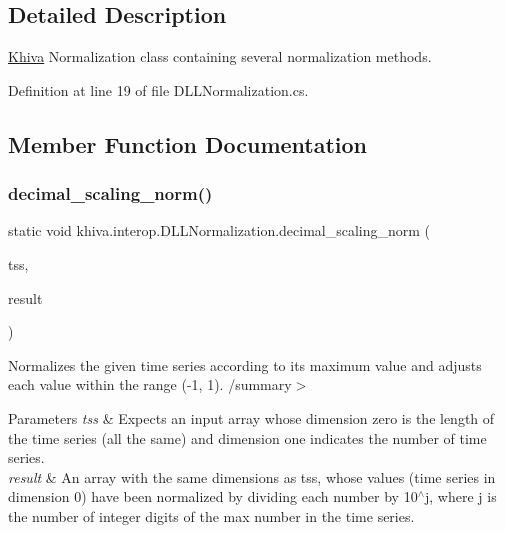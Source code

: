 \subsection{Detailed Description}
\mbox{\hyperlink{classkhiva_1_1_khiva}{Khiva}} Normalization class containing several normalization methods. 



Definition at line 19 of file D\+L\+L\+Normalization.\+cs.



\subsection{Member Function Documentation}
\mbox{\label{classkhiva_1_1interop_1_1_d_l_l_normalization_a4b8a8b57779a2e2a9681873ed38d1ead}} 
\subsubsection{\texorpdfstring{decimal\+\_\+scaling\+\_\+norm()}{decimal\_scaling\_norm()}}
{\footnotesize\ttfamily static void khiva.\+interop.\+D\+L\+L\+Normalization.\+decimal\+\_\+scaling\+\_\+norm (\begin{DoxyParamCaption}\item[{\mbox{[}\+In\mbox{]} ref Int\+Ptr}]{tss,  }\item[{\mbox{[}\+Out\mbox{]} out Int\+Ptr}]{result }\end{DoxyParamCaption})\hspace{0.3cm}{\ttfamily [static]}}



Normalizes the given time series according to its maximum value and adjusts each value within the range (-\/1, 1). /summary$>$ 
\begin{DoxyParams}{Parameters}
{\em tss} & Expects an input array whose dimension zero is the length of the time series (all the same) and dimension one indicates the number of time series.\\
\hline
{\em result} & An array with the same dimensions as tss, whose values (time series in dimension 0) have been normalized by dividing each number by 10$^\wedge$j, where j is the number of integer digits of the max number in the time series.\\
\hline
\end{DoxyParams}



